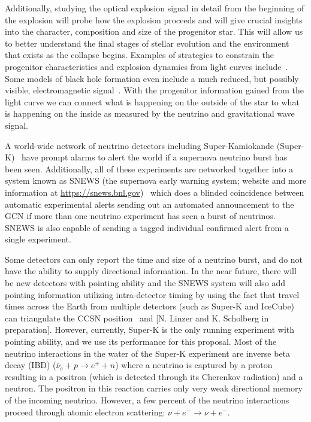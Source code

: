 \documentclass[11pt, letterpaper]{article}
\newcommand{\superk}  {Super\nobreakdash-K\xspace}
\begin{document}
Additionally, studying the optical explosion signal in detail from the
beginning of the explosion will probe how the explosion proceeds and
will give crucial insights into the character, composition and size of
the progenitor star.  This will allow us to better understand the
final stages of stellar evolution and the environment that exists as
the collapse begins.  Examples of strategies to constrain the
progenitor characteristics and explosion dynamics from light curves
include~\cite{2010ApJ...725..904N, 2017NatPh..13..510Y,
  2018ApJ...856..146A}.  Some models of black hole formation even
include a much reduced, but possibly visible, electromagnetic
signal~\cite{2013ApJ...769..109L}. With the progenitor information
gained from the light curve we can connect what is happening on the
outside of the star to what is happening on the inside as measured by
the neutrino and gravitational wave signal.
 
A world-wide network of neutrino detectors including Super-Kamiokande
(\superk)~\cite{2003NIMPA.501..418F} have prompt alarms to alert the
world if a supernova neutrino burst has been seen.  Additionally, all
of these experiments are networked together into a system known as
SNEWS (the supernova early warning system; website and more
information at \url{https://snews.bnl.gov})~\cite{2004NJPh....6..114A}
which does a blinded coincidence between automatic experimental alerts
sending out an automated announcement to the GCN if more than one
neutrino experiment has seen a burst of neutrinos. SNEWS is also
capable of sending a tagged individual confirmed alert from a single
experiment.

Some detectors can only report the time and size of a neutrino burst,
and do not have the ability to supply directional information.  In the
near future, there will be new detectors with pointing ability and the
SNEWS system will also add pointing information utilizing
intra-detector timing by using the fact that travel times across the
Earth from multiple detectors (such as \superk and IceCube) can
triangulate the CCSN position~\cite{2018JCAP...04..025B} and
[N. Linzer and K. Scholberg in preparation].  However, currently,
\superk is the only running experiment with pointing ability, and we
use its performance for this proposal. Most of the neutrino
interactions in the water of the \superk experiment are inverse beta
decay (IBD) ($ \overline{\nu}_{e}+ p \rightarrow e^{+} + n $) where a
neutrino is captured by a proton resulting in a positron (which is
detected through its Cherenkov radiation) and a neutron.  The positron
in this reaction carries only very weak directional memory of the
incoming neutrino. However, a few percent of the neutrino interactions
proceed through atomic electron scattering:
$\nu + e^{-} \rightarrow \nu + e^{-} .$
\end{document}
